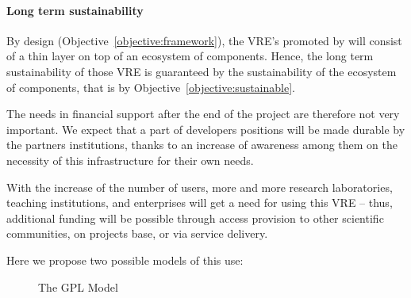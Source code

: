 \paragraph{Long term sustainability}

By design (Objective~\ref{objective:framework}), the VRE's promoted by
\TheProject will consist of a thin layer on top of an ecosystem of
components. Hence, the long term sustainability of those VRE is
guaranteed by the sustainability of the ecosystem of components, that
is by Objective~\ref{objective:sustainable}.

The needs in financial support after the end of the project are
therefore not very
important. We expect that a part of developers positions will be made
durable by the partners institutions, thanks to an increase of
awareness among them on the necessity of this infrastructure for their
own needs.

With the increase of the number of users, more and more research
laboratories, teaching institutions, and enterprises will get a need
for using this VRE – thus, additional funding will be possible through
access provision to other scientific communities, on projects base, or
via service delivery.


Here we propose two possible models of this use:

\begin{figure}[ht]\centering
 \caption{The GPL Model}\label{fig:gpl-model}
\end{figure}

